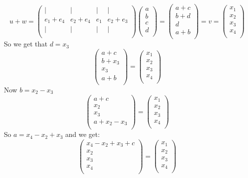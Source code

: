 \documentclass[11pt,a4paper]{article}
\theoremstyle{plain}
\begin{document}
	\[
		u+w = 
		\begin{pmatrix}
	\vert & \vert & \vert & \vert\\
	e_1+e_4 & e_2+e_4 & e_1 & e_2+e_3\\
	\vert & \vert & \vert & \vert\\
		\end{pmatrix}
		\begin{pmatrix}
	a\\
	b\\
	c\\
	d\\
		\end{pmatrix} =
		\begin{pmatrix}
	a+c\\
	b+d\\
	d\\
	a+b\\
		\end{pmatrix}
		= v =
		\begin{pmatrix}
	x_1\\
	x_2\\
	x_3\\
	x_4\\
		\end{pmatrix}	
	\]
	So we get that $d=x_3$
	\[
		\begin{pmatrix}
	a+c\\
	b+x_3\\
	x_3\\
	a+b\\
		\end{pmatrix}
		=
		\begin{pmatrix}
	x_1\\
	x_2\\
	x_3\\
	x_4\\
		\end{pmatrix}	
	\]
	Now $b=x_2-x_3$
	\[
		\begin{pmatrix}
	a+c\\
	x_2\\
	x_3\\
	a+x_2-x_3\\
		\end{pmatrix}
		=
		\begin{pmatrix}
	x_1\\
	x_2\\
	x_3\\
	x_4\\
		\end{pmatrix}	
	\]
	So $a = x_4-x_2+x_3$ and we get:
	\[
		\begin{pmatrix}
	x_4-x_2+x_3+c\\
	x_2\\
	x_3\\
	x_4\\
		\end{pmatrix}
		=
		\begin{pmatrix}
	x_1\\
	x_2\\
	x_3\\
	x_4\\
		\end{pmatrix}	
	\]
\end{document}
